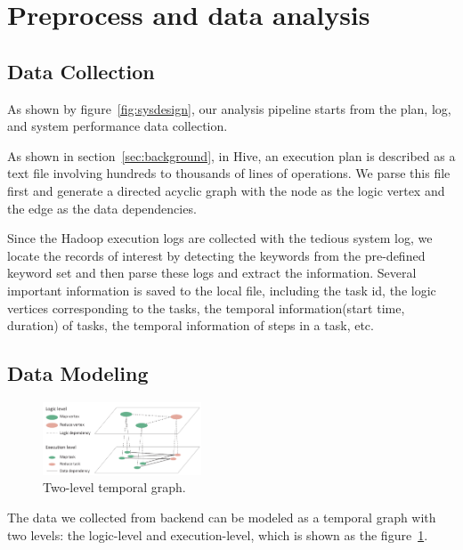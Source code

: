 \section{Preprocess and data analysis}
\subsection{Data Collection}
As shown by figure~\ref{fig:sysdesign}, our analysis pipeline starts from the plan, log, and system performance data collection.

As shown in section~\ref{sec:background}, in Hive, an execution plan is described as a text file involving hundreds to thousands of lines of operations. We parse this file first and generate a directed acyclic graph with the node as the logic vertex and the edge as the data dependencies.

Since the Hadoop execution logs are collected with the tedious system log, we locate the records of interest by detecting the keywords from the pre-defined keyword set and then parse these logs and extract the information.
Several important information is saved to the local file, including the task id, the logic vertices corresponding to the tasks, the temporal information(start time, duration) of tasks, the temporal information of steps in a task, etc. 

\subsection{Data Modeling}

\begin{figure}[t]
	\centering
	\includegraphics[width=0.42\textwidth]{figures/model/datamodel.pdf}
	\vspace{-3mm}
	\caption{Two-level temporal graph.}
	\label{fig:model}
	\vspace{-3mm}
\end{figure}

The data we collected from backend can be modeled as a temporal graph with two levels: the logic-level and execution-level, which is shown as the figure~\ref{fig:model}. 

